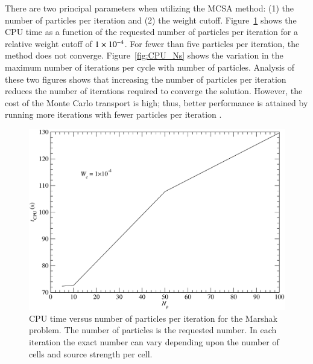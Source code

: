 \documentclass[preprint,12pt]{elsarticle}
\begin{document}
There are two principal parameters when utilizing the MCSA method: (1) the
number of particles per iteration and (2) the weight cutoff.
Figure~\ref{fig:CPU_Np} shows the CPU time as a function of the requested
number of particles per iteration for a relative weight cutoff of
$1\times 10^{-4}$.  For fewer than five particles per iteration, the method does
not converge.  Figure~\ref{fig:CPU_Ns} shows the variation in the maximum
number of iterations per cycle with number of particles.  Analysis of these
two figures shows that increasing the number of particles per iteration
reduces the number of iterations required to converge the solution.  However,
the cost of the Monte Carlo transport is high; thus, better performance is
attained by running more iterations with fewer particles per iteration
\cite{evans_2003}.
\begin{figure}[ht!]
  \centerline{ \includegraphics[width=5in,clip]{mrshk_np_CPU.pdf}}
  \caption{CPU time versus number of particles per iteration for the
    Marshak problem.  The number of particles is the requested number.
    In each iteration the exact number can vary depending upon the number
    of cells and source strength per cell.}
  \label{fig:CPU_Np}
\end{figure}
\end{document}
